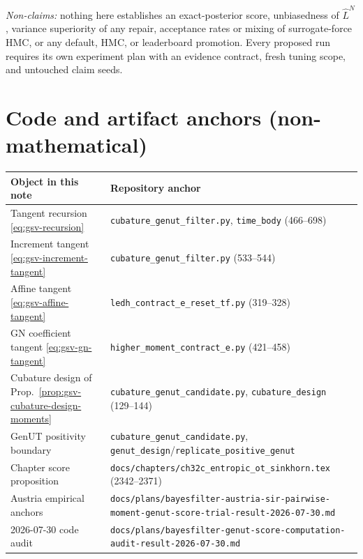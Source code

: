 \documentclass[11pt]{article}
\theoremstyle{definition}
\theoremstyle{remark}
\begin{document}
\emph{Non-claims:} nothing here establishes an exact-posterior score,
unbiasedness of $\widehat L^{N}$, variance superiority of any repair,
acceptance rates or mixing of surrogate-force HMC, or any default, HMC, or
leaderboard promotion.  Every proposed run requires its own experiment plan
with an evidence contract, fresh tuning scope, and untouched claim seeds.

\section{Code and artifact anchors (non-mathematical)}
\label{sec:gsv-anchors}

\begin{center}
\small
\begin{tabular}{@{}p{}p{}@{}}
\toprule
Object in this note & Repository anchor \\
\midrule
Tangent recursion \eqref{eq:gsv-recursion} &
\texttt{cubature\_genut\_filter.py}, \texttt{time\_body} (466--698) \\
Increment tangent \eqref{eq:gsv-increment-tangent} &
\texttt{cubature\_genut\_filter.py} (533--544) \\
Affine tangent \eqref{eq:gsv-affine-tangent} &
\texttt{ledh\_contract\_e\_reset\_tf.py} (319--328) \\
GN coefficient tangent \eqref{eq:gsv-gn-tangent} &
\texttt{higher\_moment\_contract\_e.py} (421--458) \\
Cubature design of
Prop.~\ref{prop:gsv-cubature-design-moments} &
\texttt{cubature\_genut\_candidate.py}, \texttt{cubature\_design} (129--144) \\
GenUT positivity boundary &
\texttt{cubature\_genut\_candidate.py},
\texttt{genut\_design}/\texttt{replicate\_positive\_genut} \\
Chapter score proposition &
\texttt{docs/chapters/ch32c\_entropic\_ot\_sinkhorn.tex} (2342--2371) \\
Austria empirical anchors &
\texttt{docs/plans/bayesfilter-austria-sir-pairwise-moment-genut-score-trial-result-2026-07-30.md} \\
2026-07-30 code audit &
\texttt{docs/plans/bayesfilter-genut-score-computation-audit-result-2026-07-30.md} \\
\bottomrule
\end{tabular}
\end{center}
\end{document}
